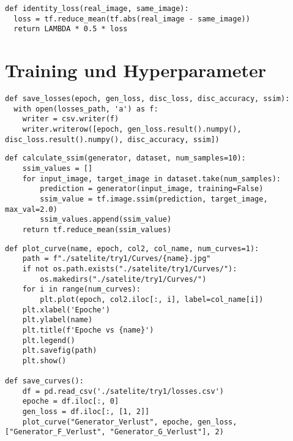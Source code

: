 \begin{lstlisting}[language=pyhaff, caption={Identitätsverlust in CycleGAN}, label={cod:identityLoss}]
def identity_loss(real_image, same_image):
  loss = tf.reduce_mean(tf.abs(real_image - same_image))
  return LAMBDA * 0.5 * loss
\end{lstlisting}

\newpage

\newpage


\newpage
\section*{Training und Hyperparameter}
\begin{lstlisting}[language=pyhaff, caption={Speicherung der Metriken in CSV-Datei}, label={cod:csvSave}]
def save_losses(epoch, gen_loss, disc_loss, disc_accuracy, ssim):
  with open(losses_path, 'a') as f:
    writer = csv.writer(f)
    writer.writerow([epoch, gen_loss.result().numpy(), disc_loss.result().numpy(), disc_accuracy, ssim])
\end{lstlisting}

\begin{lstlisting}[language=pyhaff, caption={Berechnung des SSIM-Score}, label={cod:ssim}]
def calculate_ssim(generator, dataset, num_samples=10):
    ssim_values = []
    for input_image, target_image in dataset.take(num_samples):
        prediction = generator(input_image, training=False)
        ssim_value = tf.image.ssim(prediction, target_image, max_val=2.0)
        ssim_values.append(ssim_value)
    return tf.reduce_mean(ssim_values)
\end{lstlisting}

\newpage

\begin{lstlisting}[language=pyhaff, caption={Ausschnitt zur Erstellung einer Verlaufskurve (CycleGAN Implementierung)}, label={cod:curve}]
def plot_curve(name, epoch, col2, col_name, num_curves=1):
    path = f"./satelite/try1/Curves/{name}.jpg"
    if not os.path.exists("./satelite/try1/Curves/"):
        os.makedirs("./satelite/try1/Curves/")
    for i in range(num_curves):
        plt.plot(epoch, col2.iloc[:, i], label=col_name[i])
    plt.xlabel('Epoche')
    plt.ylabel(name)
    plt.title(f'Epoche vs {name}')
    plt.legend()
    plt.savefig(path)
    plt.show()

def save_curves():
    df = pd.read_csv('./satelite/try1/losses.csv')
    epoche = df.iloc[:, 0]
    gen_loss = df.iloc[:, [1, 2]]
    plot_curve("Generator_Verlust", epoche, gen_loss, ["Generator_F_Verlust", "Generator_G_Verlust"], 2)
\end{lstlisting}